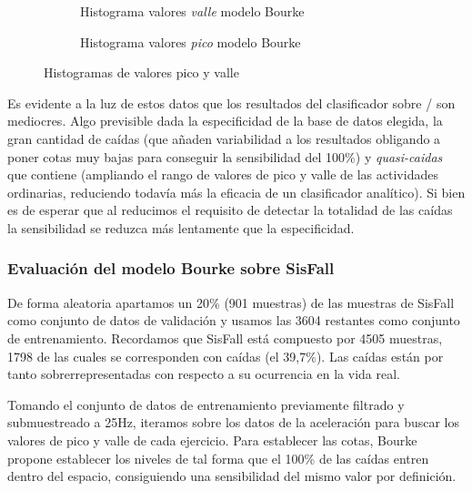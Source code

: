 \begin{figure}[htb!]
  \centering
  \begin{subfigure}[b]{0.48\textwidth}
      \centering
      \caption{Histograma valores \textit{valle} modelo Bourke}
      \label{fig:bourke:hist:low}
  \end{subfigure}
  \hfill
  \begin{subfigure}[b]{0.48\textwidth}
      \centering
      \caption{Histograma valores \textit{pico} modelo Bourke}
      \label{fig:bourke:hist:high}
  \end{subfigure}
  \caption{\label{fig:bourke:hist} Histogramas de valores pico y valle}
\end{figure}

Es evidente a la luz de estos datos que los resultados del clasificador sobre \sisfall/ son mediocres. Algo previsible dada la especificidad de la base de datos elegida, la gran cantidad de caídas (que añaden variabilidad a los resultados obligando a poner cotas muy bajas para conseguir la sensibilidad del 100\%) y \textit{quasi-caidas} que contiene (ampliando el rango de valores de pico y valle de las actividades ordinarias, reduciendo todavía más la eficacia de un clasificador analítico). Si bien es de esperar que al reducimos el requisito de detectar la totalidad de las caídas la sensibilidad se reduzca más lentamente que la especificidad.

\subsubsection{Evaluación del modelo Bourke sobre SisFall}

De forma aleatoria apartamos un 20\% (901 muestras) de las muestras de SisFall como conjunto de datos de validación y usamos las 3604 restantes como conjunto de entrenamiento. Recordamos que SisFall está compuesto por 4505 muestras, 1798 de las cuales se corresponden con caídas (el 39,7\%). Las caídas están por tanto sobrerrepresentadas con respecto a su ocurrencia en la vida real.

Tomando el conjunto de datos de entrenamiento previamente filtrado y submuestreado a 25Hz, iteramos sobre los datos de la aceleración para buscar los valores de pico y valle de cada ejercicio. Para establecer las cotas, Bourke propone establecer los niveles de tal forma que el 100\% de las caídas entren dentro del espacio, consiguiendo una sensibilidad del mismo valor por definición. 

